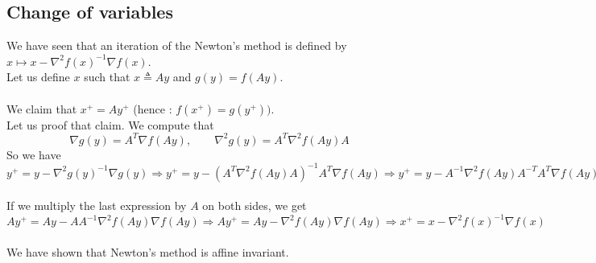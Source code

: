 \subsection{Change of variables}
We have seen that an iteration of the Newton's method is defined by $x \longmapsto x - \nabla^2f(x)^{-1}\nabla f(x)$. \\
Let us define $x$ such that $x \triangleq Ay$ and $g(y) = f(Ay)$. \\ \\
We claim that $x^+ = Ay^+$ (hence : $f(x^+) = g(y^+))$. \\
Let us proof that claim. We compute that
$$ \nabla g(y) = A^T \nabla f(Ay), \qquad \nabla^2 g(y) = A^T \nabla^2 f(Ay) A$$
So we have \\
$y^+ = y - \nabla^2 g(y)^{-1}\nabla g(y) \Longrightarrow y^+ = y - (A^T \nabla^2 f(Ay) A)^{-1} A^T \nabla f(Ay) \Longrightarrow y^+ = y - A^{-1} \nabla^2 f(Ay) A^{-T} A^T \nabla f(Ay)$ \\ \\
If we multiply the last expression by $A$ on both sides, we get \\
$ Ay^+ = Ay - AA^{-1} \nabla^2 f(Ay) \nabla f(Ay) \Longrightarrow Ay^+ = Ay - \nabla^2 f(Ay) \nabla f(Ay) \Longrightarrow x^+ = x - \nabla^2 f(x)^{-1} \nabla f(x)$ \\ \\
We have shown that Newton's method is affine invariant.


% 
